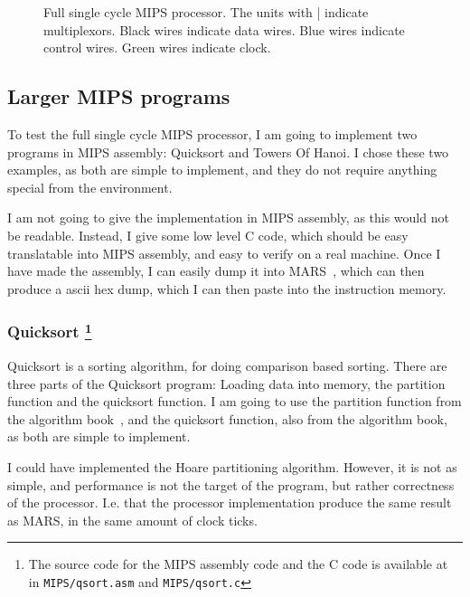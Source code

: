 \begin{figure}
{
    }
    \caption{Full single cycle MIPS processor. The units with | indicate
    multiplexors. Black wires indicate data wires. Blue wires indicate control
    wires. Green wires indicate clock.}
    \label{fig:single-proc-full}
\end{figure}

\subsection{Larger MIPS programs}
To test the full single cycle MIPS processor, I am going to implement two
programs in MIPS assembly: Quicksort and Towers Of Hanoi. I chose these two
examples, as both are simple to implement, and they do not require anything
special from the environment.

I am not going to give the implementation in MIPS assembly, as this would not
be readable. Instead, I give some low level C code, which should be easy
translatable into MIPS assembly, and easy to verify on a real machine. Once I
have made the assembly, I can easily dump it into MARS~\cite{ref:mars}, which
can then produce a ascii hex dump, which I can then paste into the instruction
memory.

\subsubsection*{Quicksort
\footnote{The source code for the MIPS assembly code and the C code is
available at~\cite{ref:github} in \texttt{MIPS/qsort.asm} and
\texttt{MIPS/qsort.c}}
}
Quicksort is a sorting algorithm, for doing comparison based sorting. There
are three parts of the Quicksort program: Loading data into memory, the
partition function and the quicksort function. I am going to use the
partition function from the algorithm book~\cite{ref:alg}, and the quicksort
function, also from the algorithm book, as both are simple to implement.

I could have implemented the Hoare partitioning algorithm. However, it is not
as simple, and performance is not the target of the program, but rather
correctness of the processor. I.e. that the processor implementation produce
the same result as MARS, in the same amount of clock ticks.

